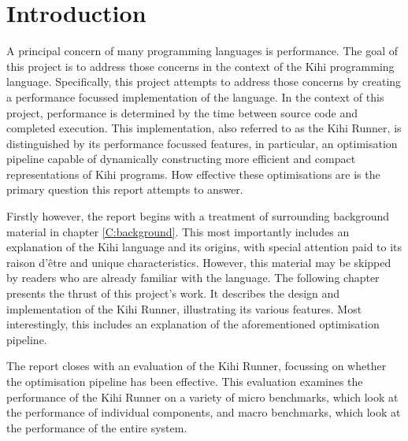 \chapter{Introduction} \label{C:intro}
A principal concern of many programming languages is performance. The goal of this project is to address those concerns in the context of the Kihi programming language. Specifically, this project attempts to address those concerns by creating a performance focussed implementation of the language. In the context of this project, performance is determined by the time between source code and completed execution. This implementation, also referred to as the Kihi Runner, is distinguished by its performance focussed features, in particular, an optimisation pipeline capable of dynamically constructing more efficient and compact representations of Kihi programs. How effective these optimisations are is the primary question this report attempts to answer.


Firstly however, the report begins with a treatment of surrounding background material in chapter \ref{C:background}. This most importantly includes an explanation of the Kihi language and its origins, with special attention paid to its raison d'être and unique characteristics. However, this material may be skipped by readers who are already familiar with the language. The following chapter presents the thrust of this project's work. It describes the design and implementation of the Kihi Runner, illustrating its various features. Most interestingly, this includes an explanation of the aforementioned optimisation pipeline. 

The report closes with an evaluation of the Kihi Runner, focussing on whether the optimisation pipeline has been effective. This evaluation examines the performance of the Kihi Runner on a variety of micro benchmarks, which look at the performance of individual components, and macro benchmarks, which look at the performance of the entire system.